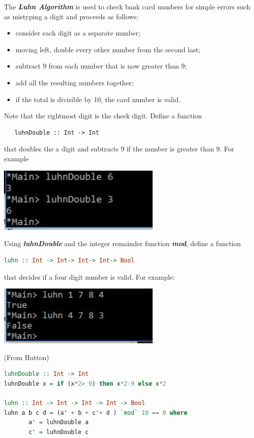 \documentclass{article}
\begin{document}
\begin{Exercise} 

 The \textbf{\textit{Luhn Algorithm}} is used to check bank card numbers for simple errors such as mistyping a digit and proceeds as follows: 
\begin{itemize}
	\item consider each digit as a separate number;
	\item moving left, double every other number from the second last;
	\item subtract 9 from each number that is now greater than 9;
	\item add all the resulting numbers together;
	\item if the total is divisible by 10, the card number is valid.
\end{itemize}
Note that the rightmost digit is the check digit. 
Define a function 
\begin{lstlisting}
   luhnDouble :: Int -> Int 
\end{lstlisting}
that doubles the a digit and subtracts 9 if the number is greater than 9. For example 
\begin{center}
	\includegraphics[width=8cm]{img/02.jpg}
\end{center}
Using \textbf{\textit{luhnDouble}} and the integer remainder function \textbf{\textit{mod}}, define a function 
\begin{lstlisting}[language=Haskell]
    luhn :: Int -> Int-> Int-> Int-> Bool
\end{lstlisting}


that decides if a four digit number is valid. For example:
\begin{center}
	\includegraphics[width=8cm]{img/03.jpg}
\end{center}
\end{Exercise}
\pagebreak
\begin{Answer}
(From Hutton) 
\begin{lstlisting}[language=Haskell]
luhnDouble :: Int -> Int
luhnDouble x = if (x*2> 9) then x*2-9 else x*2

luhn :: Int -> Int -> Int -> Int -> Bool
luhn a b c d = (a' + b + c'+ d ) `mod` 10 == 0 where
       a' = luhnDouble a
       c' = luhnDouble c
\end{lstlisting}
\end{Answer}
\end{document}
